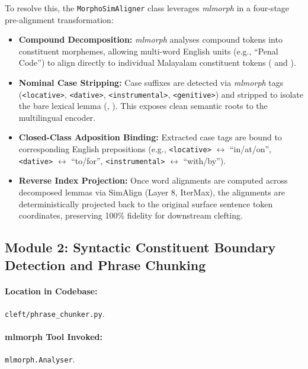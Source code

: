 To resolve this, the \texttt{MorphoSimAligner} class leverages \textit{mlmorph} in a four-stage pre-alignment transformation:
\begin{itemize}[noitemsep]
    \item \textbf{Compound Decomposition:} \textit{mlmorph} analyses compound tokens into constituent morphemes, allowing multi-word English units (e.g., ``Penal Code'') to align directly to individual Malayalam constituent tokens ( and ).
    \item \textbf{Nominal Case Stripping:} Case suffixes are detected via \textit{mlmorph} tags (\texttt{<locative>}, \texttt{<dative>}, \texttt{<instrumental>}, \texttt{<genitive>}) and stripped to isolate the bare lexical lemma (, ). This exposes clean semantic roots to the multilingual encoder.
    \item \textbf{Closed-Class Adposition Binding:} Extracted case tags are bound to corresponding English prepositions (e.g., \texttt{<locative>} $\leftrightarrow$ ``in/at/on'', \texttt{<dative>} $\leftrightarrow$ ``to/for'', \texttt{<instrumental>} $\leftrightarrow$ ``with/by'').
    \item \textbf{Reverse Index Projection:} Once word alignments are computed across decomposed lemmas via SimAlign (Layer 8, IterMax), the alignments are deterministically projected back to the original surface sentence token coordinates, preserving 100\% fidelity for downstream clefting.
\end{itemize}

\subsection{Module 2: Syntactic Constituent Boundary Detection and Phrase Chunking}
\label{subsec:mod2_chunking}

\paragraph{Location in Codebase:} \texttt{cleft/phrase\_chunker.py}.
\paragraph{mlmorph Tool Invoked:} \texttt{mlmorph.Analyser}.

